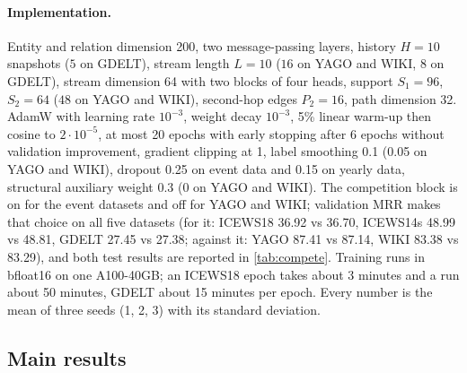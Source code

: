 \paragraph{Implementation.}
Entity and relation dimension 200, two message-passing layers, history $H = 10$ snapshots ($5$ on GDELT), stream length $L = 10$ ($16$ on YAGO and WIKI, $8$ on GDELT), stream dimension 64 with two blocks of four heads, support $S_1 = 96$, $S_2 = 64$ ($48$ on YAGO and WIKI), second-hop edges $P_2 = 16$, path dimension 32. AdamW with learning rate $10^{-3}$, weight decay $10^{-3}$, 5\% linear warm-up then cosine to $2 \cdot 10^{-5}$, at most 20 epochs with early stopping after 6 epochs without validation improvement, gradient clipping at 1, label smoothing 0.1 (0.05 on YAGO and WIKI), dropout 0.25 on event data and 0.15 on yearly data, structural auxiliary weight 0.3 (0 on YAGO and WIKI). The competition block is on for the event datasets and off for YAGO and WIKI; validation MRR makes that choice on all five datasets (for it: ICEWS18 36.92 vs 36.70, ICEWS14s 48.99 vs 48.81, GDELT 27.45 vs 27.38; against it: YAGO 87.41 vs 87.14, WIKI 83.38 vs 83.29), and both test results are reported in \cref{tab:compete}. Training runs in bfloat16 on one A100-40GB; an ICEWS18 epoch takes about 3 minutes and a run about 50 minutes, GDELT about 15 minutes per epoch. Every number is the mean of three seeds (1, 2, 3) with its standard deviation.

\subsection{Main results}

